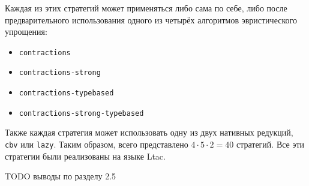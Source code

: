 \documentclass[../diploma.tex]{subfiles}
\begin{document}
Каждая из этих стратегий может применяться либо сама по себе, либо после предварительного использования одного из четырёх алгоритмов эвристического упрощения:
\begin{itemize}
    \item \texttt{contractions}
    \item \texttt{contractions-strong}
    \item \texttt{contractions-typebased}
    \item \texttt{contractions-strong-typebased}
\end{itemize}

Также каждая стратегия может использовать одну из двух нативных редукций, \texttt{cbv} или \texttt{lazy}. Таким образом, всего представлено $4 \cdot 5 \cdot 2 = 40$ стратегий. Все эти стратегии были реализованы на языке Ltac.

TODO выводы по разделу 2.5
\end{document}
